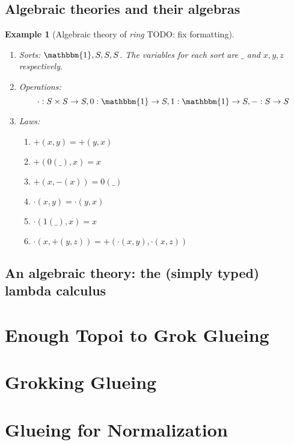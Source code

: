 \documentclass[12pt,twoside]{reedthesis}
\newtheorem{example}{Example}
\begin{document}
\section{Algebraic theories and their algebras}
\begin{example}[Algebraic theory of \emph{ring} TODO: fix formatting]
  \begin{enumerate}
    \item Sorts: \( \mathbbm{1}, S, S, S \). The variables for each sort are
          \( \_ \) and \( x, y, z\) respectively.

    \item Operations: \[
          \cdot : S \times S \rightarrow S,
          0 : \mathbbm{1} \rightarrow S,
          1 : \mathbbm{1} \rightarrow S,
          - : S \rightarrow S\]

        \item Laws: \begin{enumerate}
          \item \( +(x,y) = +(y,x) \)
          \item \( +(0(\_), x) = x \)
          \item \( +(x, -(x)) = 0(\_) \)

          \item \( \cdot(x,y) = \cdot(y,x) \)
          \item \( \cdot(1(\_), x) = x \)

          \item \( \cdot(x, +(y,z)) = +(\cdot(x,y), \cdot(x,z))\)
    \end{enumerate}
  \end{enumerate}
\end{example}
\section{An algebraic theory: the (simply typed) lambda calculus}


\chapter{Enough Topoi to Grok Glueing}
\chapter{Grokking Glueing}
\chapter{Glueing for Normalization}
\end{document}
